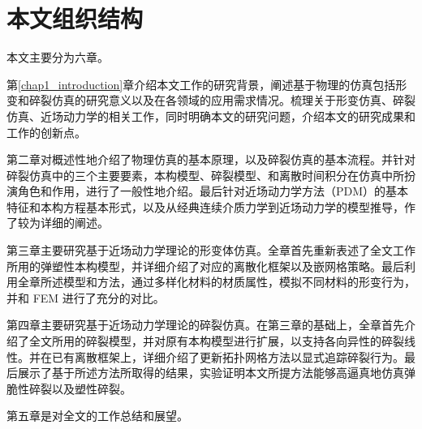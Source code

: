 \section{本文组织结构}
本文主要分为六章。

第\ref{chap1_introduction}章介绍本文工作的研究背景，阐述基于物理的仿真包括形变和碎裂仿真的研究意义以及在各领域的应用需求情况。梳理关于形变仿真、碎裂仿真、近场动力学的相关工作，同时明确本文的研究问题，介绍本文的研究成果和工作的创新点。

第二章对概述性地介绍了物理仿真的基本原理，以及碎裂仿真的基本流程。并针对碎裂仿真中的三个主要要素，本构模型、碎裂模型、和离散时间积分在仿真中所扮演角色和作用，进行了一般性地介绍。最后针对近场动力学方法（PDM）的基本特征和本构方程基本形式，以及从经典连续介质力学到近场动力学的模型推导，作了较为详细的阐述。

第三章主要研究基于近场动力学理论的形变体仿真。全章首先重新表述了全文工作所用的弹塑性本构模型，并详细介绍了对应的离散化框架以及嵌网格策略。最后利用全章所述模型和方法，通过多样化材料的材质属性，模拟不同材料的形变行为，并和 FEM 进行了充分的对比。

第四章主要研究基于近场动力学理论的碎裂仿真。在第三章的基础上，全章首先介绍了全文所用的碎裂模型，并对原有本构模型进行扩展，以支持各向异性的碎裂线性。并在已有离散框架上，详细介绍了更新拓扑网格方法以显式追踪碎裂行为。最后展示了基于所述方法所取得的结果，实验证明本文所提方法能够高逼真地仿真弹脆性碎裂以及塑性碎裂。

第五章是对全文的工作总结和展望。


